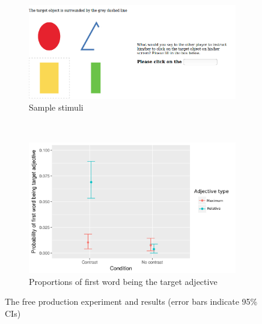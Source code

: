 \documentclass[10pt,letterpaper]{article}
\begin{document}
\begin{figure}[ht]
  \centering
  \begin{subfigure}[b]{0.55\textwidth}
    \includegraphics[width=\textwidth]{plots/freeprodTurk.png}
    \caption{Sample stimuli}
    \label{fig:freeprodturk}
  \end{subfigure}
  ~ %
  \begin{subfigure}[b]{0.4\textwidth}
    \includegraphics[width=\textwidth]{plots/freeprodPlot.png}
    \caption{Proportions of first word being the target adjective}
    \label{fig:freeprodplot}
  \end{subfigure}
  \caption{The free production experiment and results (error bars indicate 95\% CIs)}
  \vspace{-2ex}
  \label{fig:freeprod}
\end{figure}
\end{document}
